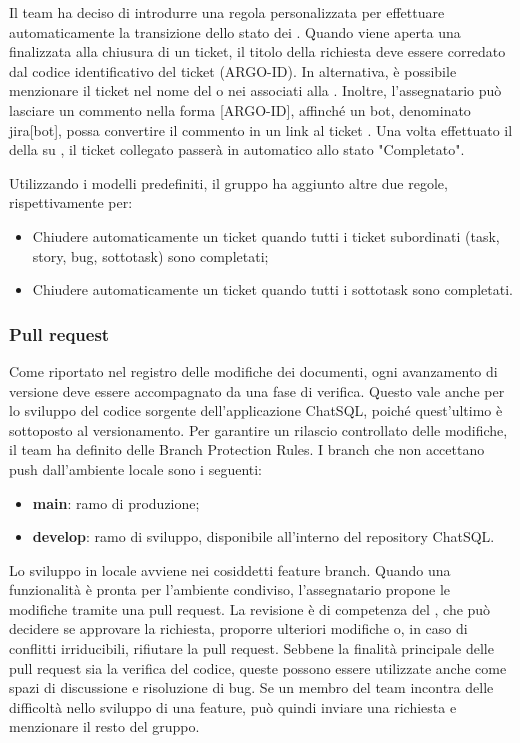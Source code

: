 \vspace{0.5\baselineskip}
\par Il team ha deciso di introdurre una regola personalizzata per effettuare automaticamente la transizione dello stato dei . Quando viene aperta una  finalizzata alla chiusura di un ticket, il titolo della richiesta deve essere corredato dal codice identificativo del ticket (ARGO-ID). In alternativa, è possibile menzionare il ticket nel nome del  o nei  associati alla . Inoltre, l’assegnatario può lasciare un commento nella forma [ARGO-ID], affinché un bot, denominato jira[bot], possa convertire il commento in un link al ticket . Una volta effettuato il  della  su , il ticket collegato passerà in automatico allo stato "Completato".
\par Utilizzando i modelli predefiniti, il gruppo ha aggiunto altre due regole, rispettivamente per:
\begin{itemize}
  \item Chiudere automaticamente un ticket quando tutti i ticket subordinati (task, story, bug, sottotask) sono completati;
  \item Chiudere automaticamente un ticket quando tutti i sottotask sono completati.
\end{itemize}

\subsubsection{Pull request} \label{sec:pull_request}
Come riportato nel registro delle modifiche dei documenti, ogni avanzamento di versione deve essere accompagnato da una fase di verifica. Questo vale anche per lo sviluppo del codice sorgente dell'applicazione ChatSQL, poiché quest'ultimo è sottoposto al versionamento. Per garantire un rilascio controllato delle modifiche, il team ha definito delle Branch Protection Rules. I branch che non accettano push dall’ambiente locale sono i seguenti:
\begin{itemize}
  \item \textbf{main}: ramo di produzione;
  \item \textbf{develop}: ramo di sviluppo, disponibile all'interno del repository ChatSQL.
\end{itemize}
\par Lo sviluppo in locale avviene nei cosiddetti feature branch. Quando una funzionalità è pronta per l'ambiente condiviso, l'assegnatario propone le modifiche tramite una pull request. La revisione è di competenza del \Verificatore{}, che può decidere se approvare la richiesta, proporre ulteriori modifiche o, in caso di conflitti irriducibili, rifiutare la pull request. Sebbene la finalità principale delle pull request sia la verifica del codice, queste possono essere utilizzate anche come spazi di discussione e risoluzione di bug. Se un membro del team incontra delle difficoltà nello sviluppo di una feature, può quindi inviare una richiesta e menzionare il resto del gruppo.

